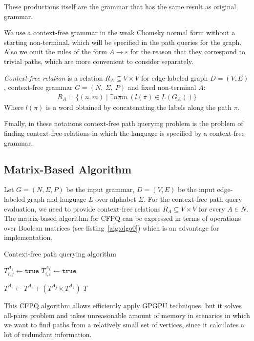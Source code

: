 These productions itself are the grammar that has the same result as original grammar.

We use a context-free grammar in the weak Chomsky normal form without a starting non-terminal, which will be specified in the path queries for the graph. Also we omit the rules of the form $A \rightarrow \varepsilon$ for the reason that they correspond to trivial paths, which are more convenient to consider separately.

\begin{definition}\emph{Context-free relation} is a relation $R_A \subseteq V \times V$ for edge-labeled graph $D = (V, E)$, context-free grammar $G = (N,~\Sigma,~P)$ and fixed non-terminal $A$:
\begin{align*}
     R_A = \{(n, m) \mid \exists n \pi m~(l(\pi) \in L(G_A))\}
\end{align*}
Where $l(\pi)$ is a word obtained by concatenating the labels along the path $\pi$.
\end{definition}

Finally, in these notations context-free path querying problem is the problem of finding context-free relations in which the language is specified by a context-free grammar.
 
\subsection{Matrix-Based Algorithm}
Let $G = (N, \Sigma, P)$ be the input grammar, $D = (V, E)$ be the input edge-labeled graph and language $L$ over alphabet $\Sigma$. For the context-free path query evaluation, we need to provide context-free relations \mbox{$R_A \subseteq V \times V$} for every \mbox{$A \in N$}.
The matrix-based algorithm for CFPQ can be expressed in terms of operations over Boolean matrices (see listing~\ref{alg:algo0}) which is an advantage for implementation.
{\footnotesize
\begin{algorithm}
\begin{algorithmic}[1]
\caption{Context-free path querying algorithm}
\label{alg:algo0}
          {$T^{A_k}_{i,j} \gets \texttt{true}$}
    \EndFor
            {$T^{A_k}_{i,i} \gets \texttt{true}$}
        \EndFor
    \EndFor

          { $T^{A_i} \gets T^{A_i} + (T^{A_j} \times T^{A_k})$ } 
        \EndFor
    \EndWhile
\State \Return $T$
\EndFunction
\end{algorithmic}
\end{algorithm}
}

This CFPQ algorithm allows efficiently apply GPGPU techniques, but it solves all-pairs problem and takes unreasonable amount of memory in scenarios in which we want to find paths from a relatively small set of vertices, since it calculates a lot of redundant information.  